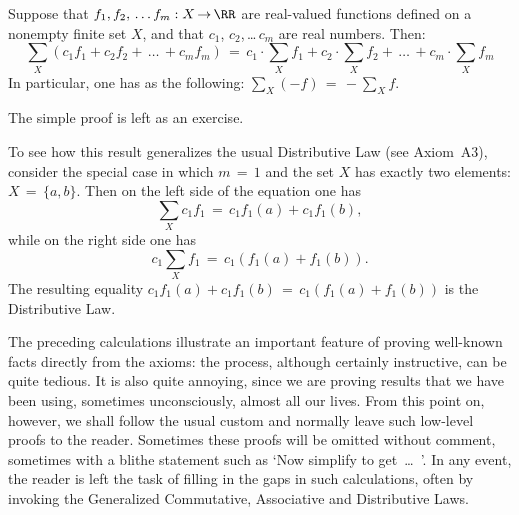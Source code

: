 {        Suppose that $f_{1},f_{2},\,{\ldots}\,f_{m}:X \,{\rightarrow}\, {\RR}$ are real-valued functions defined on a nonempty finite set $X$,
    and that $c_{1}$, $c_{2}$,\,{\ldots}\,$c_{m}$ are real numbers. Then:
        \begin{equation}
        \label{EqnB.10}
        {\sum}_{X} (c_{1}f_{1} + c_{2}f_{2} + \,{\ldots}\,+ c_{m}f_{m}) \,=\, 
    c_{1}{\cdot}{\sum}_{X} f_{1} + c_{2}{\cdot}{\sum}_{X} f_{2} + \,{\ldots}\,+ c_{m}{\cdot}{\sum}_{X} f_{m}
        \end{equation}
        In particular, one has as the following: ${\sum}_{X} (-f) \,=\, -{\sum}_{X} f$.

\V

        The simple proof is left as an exercise.

\V

        To see how this result generalizes the usual Distributive Law (see Axiom~A3),
    consider the special case in which $m \,=\, 1$ and the set $X$ has exactly two elements: $X \,=\, \{a,b\}$.
    Then on the left side of the equation one has
        \begin{displaymath}
        {\sum}_{X} c_{1}f_{1} \,=\, c_{1}f_{1}(a) + c_{1}f_{1}(b),
        \end{displaymath}
    while on the right side one has
        \begin{displaymath}
        c_{1}{\sum}_{X} f_{1} \,=\, c_{1}(f_{1}(a)+f_{1}(b)).
        \end{displaymath}
    The resulting  equality $c_{1}f_{1}(a) + c_{1}f_{1}(b) \,=\, c_{1}(f_{1}(a)+f_{1}(b))$ is the Distributive Law.

\V
\V

        The preceding calculations illustrate an important feature of proving well-known facts directly from the axioms:
    the process, although certainly instructive, can be quite tedious.
    It is also quite annoying, since we are proving results that we have been using, sometimes unconsciously, almost all our lives.
    From this point on, however, we shall follow the usual custom and normally leave such low-level proofs to the reader.
    Sometimes these proofs will be omitted without comment, sometimes with a blithe statement such as `Now simplify to get \,{\ldots}\, '.
    In any event, the reader is left the task of filling in the gaps in such calculations, often by invoking the Generalized Commutative, Associative and Distributive Laws.
    

\V
\V



}
